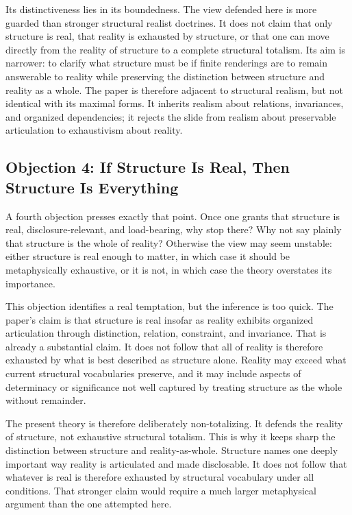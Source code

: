 \documentclass[11pt]{article}
\begin{document}
Its distinctiveness lies in its boundedness. The view defended here is more guarded than stronger structural realist doctrines. It does not claim that only structure is real, that reality is exhausted by structure, or that one can move directly from the reality of structure to a complete structural totalism. Its aim is narrower: to clarify what structure must be if finite renderings are to remain answerable to reality while preserving the distinction between structure and reality as a whole. The paper is therefore adjacent to structural realism, but not identical with its maximal forms. It inherits realism about relations, invariances, and organized dependencies; it rejects the slide from realism about preservable articulation to exhaustivism about reality.

\subsection{Objection 4: If Structure Is Real, Then Structure Is Everything}

A fourth objection presses exactly that point. Once one grants that structure is real, disclosure-relevant, and load-bearing, why stop there? Why not say plainly that structure is the whole of reality? Otherwise the view may seem unstable: either structure is real enough to matter, in which case it should be metaphysically exhaustive, or it is not, in which case the theory overstates its importance.

This objection identifies a real temptation, but the inference is too quick. The paper's claim is that structure is real insofar as reality exhibits organized articulation through distinction, relation, constraint, and invariance. That is already a substantial claim. It does not follow that all of reality is therefore exhausted by what is best described as structure alone. Reality may exceed what current structural vocabularies preserve, and it may include aspects of determinacy or significance not well captured by treating structure as the whole without remainder.

The present theory is therefore deliberately non-totalizing. It defends the reality of structure, not exhaustive structural totalism. This is why it keeps sharp the distinction between structure and reality-as-whole. Structure names one deeply important way reality is articulated and made disclosable. It does not follow that whatever is real is therefore exhausted by structural vocabulary under all conditions. That stronger claim would require a much larger metaphysical argument than the one attempted here.
\end{document}
